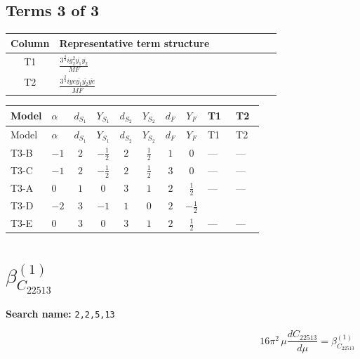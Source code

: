 \documentclass[8pt]{article}
\begin{document}
\begin{landscape}
\subsection*{Terms 3 of 3}
\begin{center}
\begin{tabular}{@{}c >{\raggedright\arraybackslash}p{0.82\linewidth}@{}}
\toprule
Column & Representative term structure \\
\midrule
T1 & \(\displaystyle \frac{3^{\frac{3}{4}} i g_{2}^{2} \overline{y_{1}} \overline{y_{2}}}{MF}\) \\
\midrule
T2 & \(\displaystyle \frac{3^{\frac{3}{4}} i ye \overline{y_{1}} \overline{y_{2}} \overline{ye}}{MF}\) \\
\midrule
\bottomrule
\end{tabular}
\end{center}
\smallskip
\tiny
\begin{longtable}{@{}llcccccc >{\raggedright\arraybackslash}p{0.21\linewidth} >{\raggedright\arraybackslash}p{0.21\linewidth}@{}}
\toprule
Model & $\alpha$ & $d_{S_1}$ & $Y_{S_1}$ & $d_{S_2}$ & $Y_{S_2}$ & $d_F$ & $Y_F$ & T1 & T2 \\
\midrule
\endfirsthead
\toprule
Model & $\alpha$ & $d_{S_1}$ & $Y_{S_1}$ & $d_{S_2}$ & $Y_{S_2}$ & $d_F$ & $Y_F$ & T1 & T2 \\
\midrule
\endhead
T3-B & $-1$ & $2$ & $-\frac{1}{2}$ & $2$ & $\frac{1}{2}$ & $1$ & $0$ & --- & --- \\
\midrule
T3-C & $-1$ & $2$ & $-\frac{1}{2}$ & $2$ & $\frac{1}{2}$ & $3$ & $0$ & --- & --- \\
\midrule
T3-A & $0$ & $1$ & $0$ & $3$ & $1$ & $2$ & $\frac{1}{2}$ & --- & --- \\
\midrule
T3-D & $-2$ & $3$ & $-1$ & $1$ & $0$ & $2$ & $-\frac{1}{2}$ & \scriptsize\adjustbox{max width=\linewidth}{$\begin{gathered} \frac{11 \cdot 3^{\frac{3}{4}} i g_{2}^{2} \overline{y_{1}} \overline{y_{2}}}{8 MF}\end{gathered}$} & \scriptsize\adjustbox{max width=\linewidth}{$\begin{gathered} - \frac{3^{\frac{3}{4}} i ye \overline{y_{1}} \overline{y_{2}} \overline{ye}}{12 MF}\end{gathered}$} \\
\midrule
T3-E & $0$ & $3$ & $0$ & $3$ & $1$ & $2$ & $\frac{1}{2}$ & --- & --- \\
\midrule
\bottomrule
\end{longtable}
\clearpage
\section*{$\beta_{C_{22513}}^{(1)}$}
\noindent\textbf{Search name: }\texttt{2,2,5,13}\par\smallskip
\[16\pi^2\,\mu\frac{d C_{22513}}{d\mu}=\beta_{C_{22513}}^{(1)}\]

\end{landscape}
\end{document}

